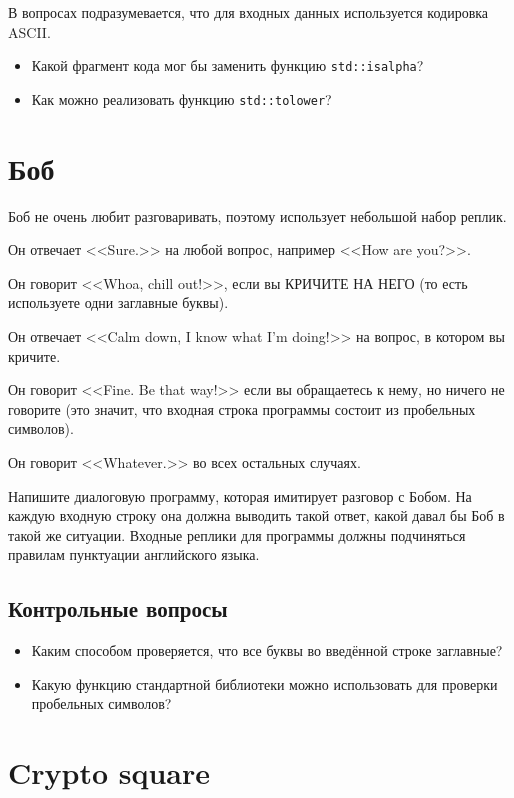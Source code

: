 \documentclass[10pt,twoside,openany]{book}
\begin{document}
В вопросах подразумевается, что для входных данных используется кодировка ASCII.

\begin{itemize}
    \item Какой фрагмент кода мог бы заменить функцию {\tt std::isalpha}?
    \item Как можно реализовать функцию {\tt std::tolower}?
\end{itemize}

\section{Боб}

Боб не очень любит разговаривать, поэтому использует небольшой набор реплик.

Он отвечает <<Sure.>> на любой вопрос, например <<How are you?>>.

Он говорит <<Whoa, chill out!>>, если вы КРИЧИТЕ НА НЕГО (то есть используете одни заглавные буквы).

Он отвечает <<Calm down, I know what I'm doing!>> на вопрос, в котором вы кричите.

Он говорит <<Fine. Be that way!>> если вы обращаетесь к нему, но ничего
не говорите (это значит, что входная строка программы состоит из пробельных символов).

Он говорит <<Whatever.>> во всех остальных случаях.

Напишите диалоговую программу, которая имитирует разговор с Бобом. На каждую входную строку она
должна выводить такой ответ, какой давал бы Боб в такой же ситуации. Входные реплики для программы
должны подчиняться правилам пунктуации английского языка.

\subsection*{Контрольные вопросы}

\begin{itemize}
    \item Каким способом проверяется, что все буквы во введённой строке заглавные?
    \item Какую функцию стандартной библиотеки можно использовать для проверки пробельных символов?
\end{itemize}

\section{Crypto square}
\end{document}
